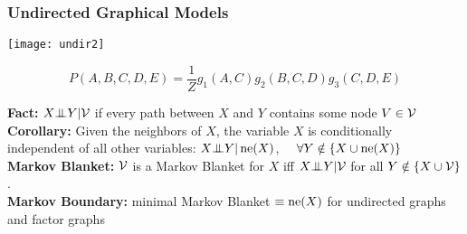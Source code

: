 \begin{frame}
\frametitle{Undirected Graphical Models}

\vspace*{-1.5ex}
\centerline{
\texttt{[image: undir2]}
}
\vspace*{0.1mm}

\[
P(A,B,C,D,E) = \frac{1}{Z} g_1(A,C) g_2(B,C,D) g_3(C,D,E)
\]

{\bf Fact:} $X {\bot\negthickspace\negthickspace\bot} Y | {\cal V}$ if every path between $X$ and $Y$
contains some node $V \in {\cal V}$ \\

{\bf Corollary:} Given the neighbors of $X$, the variable $X$ is conditionally
independent of all other variables: $X {\bot\negthickspace\negthickspace\bot} Y | \operatorname{ne}(X)$, \ \ $\forall Y \notin
\{X \cup \operatorname{ne}(X)\}$\\

{\bf Markov Blanket:} ${\cal V}$ is a Markov Blanket for $X$ iff $X{\bot\negthickspace\negthickspace\bot}
Y|{\cal V}$ for all $Y \notin \{ X \cup {\cal V}\}$.\\

{\bf Markov Boundary:} minimal Markov Blanket $\equiv \operatorname{ne}(X)$ for
undirected graphs and factor graphs




\end{frame}

